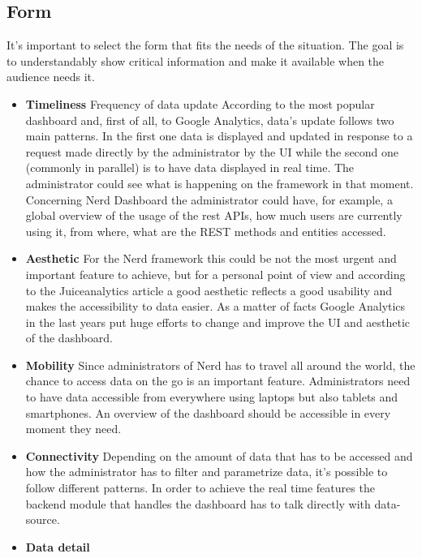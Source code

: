 \documentclass[a4paper,13pt]{report}
\begin{document}
\subsection{Form}
It's important to select the form that fits the needs of the situation.
The goal is to understandably show critical information and make it available when the audience needs it.
\begin{itemize}
\item  \textbf{Timeliness}\newline
Frequency of  data update
According to the most popular dashboard and, first of all, to Google Analytics, data's update follows two main patterns. In the first one data  is displayed and updated in response to a request made directly by the administrator by the UI while the second one (commonly in parallel) is to have data  displayed in real time. The administrator could see what is happening on the framework in that moment. Concerning Nerd Dashboard the administrator could have, for example, a global overview of the usage of the rest APIs, how much users are currently using it, from where, what are the REST methods and entities accessed.
\item \textbf{Aesthetic}\newline
For the Nerd framework this could be not the most urgent and important feature to achieve, but for a personal point of view and according to the Juiceanalytics article \cite{Juice} a good aesthetic reflects a good usability and makes the accessibility to  data easier.
As a matter of facts Google Analytics in the last years put huge efforts to change and improve the UI and aesthetic of the dashboard.
\item\textbf{Mobility}\newline
Since administrators of Nerd has to travel all around the world, the chance to access data on the go is an important feature. Administrators need to have data accessible from everywhere using laptops but also tablets and smartphones. An overview of the dashboard should be accessible in every moment they need.
\item \textbf{Connectivity}\newline
Depending on the amount of data that has to be accessed and how the administrator has to filter and parametrize data, it's possible to follow different patterns. 
In order to achieve the real time features the backend module that handles the dashboard has to talk directly with data-source.
\item \textbf{Data detail}\newline

\end{itemize}
\end{document}
